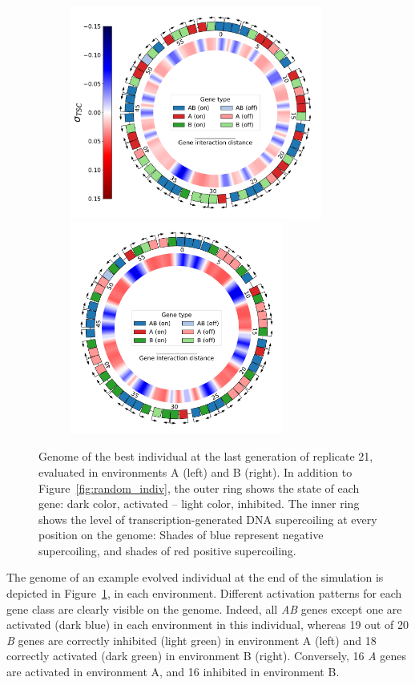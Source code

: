 \begin{figure}[H]
  \centering
  \begin{subfigure}[t]{\textwidth}
    \centering
    \includegraphics[height=7cm]{ploscb/img/genome_and_tsc_rep21_env_A.pdf}
    \hspace{-0.5cm}
    \includegraphics[height=7cm]{ploscb/img/genome_and_tsc_rep21_env_B.pdf}
  \end{subfigure}
  \caption{Genome of the best individual at the last generation of replicate 21, evaluated in environments A (left) and B (right).
  In addition to Figure~\ref{fig:random_indiv}, the outer ring shows the state of each gene: dark color, activated -- light color, inhibited.
  The inner ring shows the level of transcription-generated DNA supercoiling at every position on the genome: Shades of blue represent negative supercoiling, and shades of red positive supercoiling.}
  \label{fig:genomes}
\end{figure}

The genome of an example evolved individual at the end of the simulation is depicted in Figure~\ref{fig:genomes}, in each environment.
Different activation patterns for each gene class are clearly visible on the genome.
Indeed, all \emph{AB} genes except one are activated (dark blue) in each environment in this individual, whereas 19 out of 20 \emph{B} genes are correctly inhibited (light green) in environment A (left) and 18 correctly activated (dark green) in environment B (right).
Conversely, 16 \emph{A} genes are activated in environment A, and 16 inhibited in environment B.

